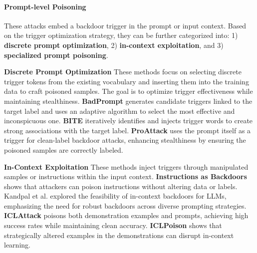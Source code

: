 \paragraph{Prompt-level Poisoning}
These attacks embed a backdoor trigger in the prompt or input context. Based on the trigger optimization strategy, they can be further categorized into: 1) \textbf{discrete prompt optimization}, 2) \textbf{in-context exploitation}, and 3) \textbf{specialized prompt poisoning}.

\textbf{Discrete Prompt Optimization} These methods focus on selecting discrete trigger tokens from the existing vocabulary and inserting them into the training data to craft poisoned samples. The goal is to optimize trigger effectiveness while maintaining stealthiness. \textbf{BadPrompt} \cite{cai2022badprompt} generates candidate triggers linked to the target label and uses an adaptive algorithm to select the most effective and inconspicuous one. \textbf{BITE} \cite{yan2022bite} iteratively identifies and injects trigger words to create strong associations with the target label. \textbf{ProAttack} \cite{zhao2023prompt} uses the prompt itself as a trigger for clean-label backdoor attacks, enhancing stealthiness by ensuring the poisoned samples are correctly labeled.

\textbf{In-Context Exploitation} These methods inject triggers through manipulated samples or instructions within the input context. \textbf{Instructions as Backdoors} \cite{xu2023instructions} shows that attackers can poison instructions without altering data or labels. Kandpal et al. \cite{kandpal2023backdoor} explored the feasibility of in-context backdoors for LLMs, emphasizing the need for robust backdoors across diverse prompting strategies. \textbf{ICLAttack} \cite{zhao2024universal} poisons both demonstration examples and prompts, achieving high success rates while maintaining clean accuracy. \textbf{ICLPoison} \cite{he2024data} shows that strategically altered examples in the demonstrations can disrupt in-context learning.


